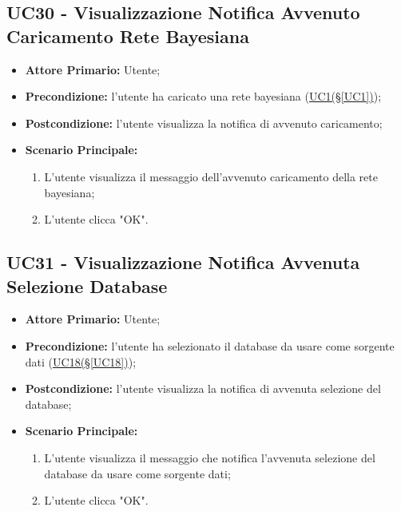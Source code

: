 \pagebreak

\subsection{UC30 - Visualizzazione Notifica Avvenuto Caricamento Rete Bayesiana}\label{UC30}

\begin{itemize}
	\item \textbf{Attore Primario:} Utente;
	\item \textbf{Precondizione:} l'utente ha caricato una rete bayesiana (\hyperref[UC1]{UC1(§\ref*{UC1})});
	\item \textbf{Postcondizione:} l'utente visualizza la notifica di avvenuto caricamento;
	\item \textbf{Scenario Principale:}
	\begin{enumerate}
		\item L'utente visualizza il messaggio dell'avvenuto caricamento della rete bayesiana;
		\item L'utente clicca "OK".
	\end{enumerate}
\end{itemize}

\pagebreak

\subsection{UC31 - Visualizzazione Notifica Avvenuta Selezione Database}\label{UC31}

\begin{itemize}
	\item \textbf{Attore Primario:} Utente;
	\item \textbf{Precondizione:} l'utente ha selezionato il database da usare come sorgente dati (\hyperref[UC18]{UC18(§\ref*{UC18})});
	\item \textbf{Postcondizione:} l'utente visualizza la notifica di avvenuta selezione del database;
	\item \textbf{Scenario Principale:}
	\begin{enumerate}
		\item L'utente visualizza il messaggio che notifica l'avvenuta selezione del database da usare come sorgente dati;
		\item L'utente clicca "OK".
	\end{enumerate}
\end{itemize}

\pagebreak

